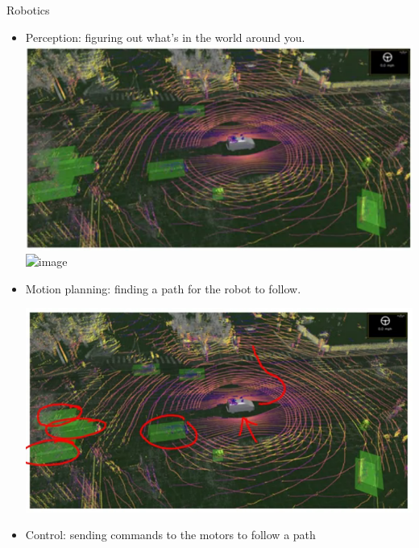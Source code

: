 \documentclass[pdf]{beamer}
\theoremstyle{mystyle}
\begin{document}
\begin{frame}{Robotics}
	\begin{itemize}
		\item Perception: figuring out what's in the world around you. \\
		\includegraphics[scale=.2]{perception} \; \includegraphics<2->[scale=.2]{perception-2} \\
		\item<3-> Motion planning: finding a path for the robot to follow.
		\begin{center}
			\includegraphics[scale=.25]{motion-planning}	
		\end{center}
		\item<4-> Control: sending commands to the motors to follow a path		
	\end{itemize}
\end{frame}
\end{document}
